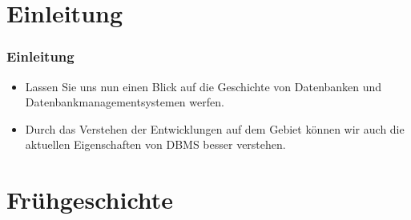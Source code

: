 \documentclass[aspectratio=169,mathserif,notheorems]{beamer}%
\subtitle{4. Geschichte}%
\begin{document}
%
%
\startPresentation%
%
\section{Einleitung}%
%
\begin{frame}[t]%
\frametitle{Einleitung}%
\begin{itemize}%
%
\item Lassen Sie uns nun einen Blick auf die Geschichte von Datenbanken und Datenbankmanagementsystemen werfen\cite{S2024D:THOD,Q2022ATODHDM,M2024ABHOD,YM2024DDMSD,F2021ABHODM}.%
\item<2-> Durch das Verstehen der Entwicklungen auf dem Gebiet können wir auch die aktuellen Eigenschaften von DBMS besser verstehen.%
%
\end{itemize}%
\end{frame}%
%
\section{Frühgeschichte}%
%
\end{document}
